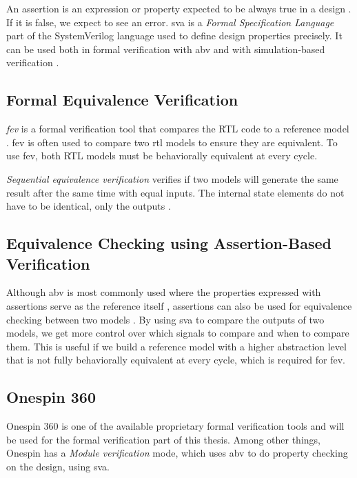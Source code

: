 An assertion is an expression or property expected to be always true in a design \cite{mehtaSystemVerilogAssertions2020}. If it is false, we expect to see an error. 
\acrfull{sva} is a \textit{Formal Specification Language} part of the SystemVerilog language used to define design properties precisely. It can be used both in formal verification with \acrfull{abv} and with simulation-based verification \cite{cernySVAPowerAssertions2015}.

\subsection{Formal Equivalence Verification}

\textit{\acrfull{fev}} is a formal verification tool that compares the RTL code to a reference model \cite{seligmanFormalVerificationEssential2015}. \acrshort{fev} is often used to compare two \acrshort{rtl} models to ensure they are equivalent. To use \acrshort{fev}, both RTL models must be behaviorally equivalent at every cycle.

\textit{Sequential equivalence verification} verifies if two models will generate the same result after the same time with equal inputs. The internal state elements do not have to be identical, only the outputs \cite{seligmanFormalVerificationEssential2015}.


\subsection{Equivalence Checking using Assertion-Based Verification}
\label{sec:bg_eq_abv}

Although \acrshort{abv} is most commonly used where the properties expressed with assertions serve as the reference itself \cite{seligmanFormalVerificationEssential2015}, assertions can also be used for equivalence checking between two models \cite{kumarEquivalenceCheckingUsing2015}. By using \acrshort{sva} to compare the outputs of two models, we get more control over which signals to compare and when to compare them. This is useful if we build a reference model with a higher abstraction level that is not fully behaviorally equivalent at every cycle, which is required for \acrshort{fev}.


\subsection{Onespin 360}

Onespin 360 \cite{onespinsolutionsgmbhUserManualOneSpin} is one of the available proprietary formal verification tools and will be used for the formal verification part of this thesis. Among other things, Onespin has a \textit{Module verification} mode, which uses \acrshort{abv} to do property checking on the design, using \acrfull{sva}.

